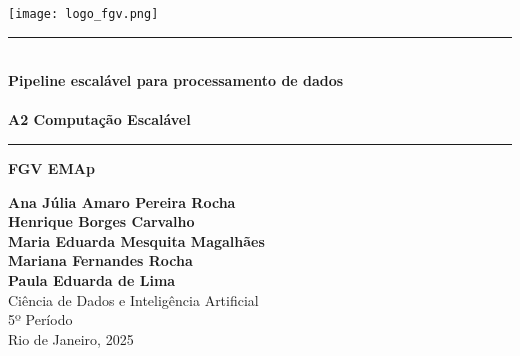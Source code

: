 \documentclass[a4paper,12pt]{article}
\begin{document}
\begin{titlepage}
    \begin{center}

        \vspace{1cm}
        \begin{minipage}{0.45\textwidth}
            \centering
            \texttt{[image: logo\_fgv.png]}    
        \end{minipage}
        \vspace{2cm}

        \rule{1\textwidth}{0.4pt} \\ %
        \vspace{0.3cm}
        {\Huge \textbf{Pipeline escalável para processamento de dados}} \\
        \vspace{0.2cm}
        \vspace{0.5cm}\\
        {\Large \textbf{A2 Computação Escalável}}\\
        \rule{1\textwidth}{0.4pt} %


        \vspace{0.5cm}
        {\Large \textbf{FGV EMAp}} \\
        \vspace{2cm}
        
        

        
        
        
        {\large 
            \textbf{Ana Júlia Amaro Pereira Rocha} \\ 
            \textbf{Henrique Borges Carvalho} \\
            \textbf{Maria Eduarda Mesquita Magalhães}\\
            \textbf{Mariana Fernandes Rocha} \\
            \textbf{Paula Eduarda de Lima}}\\[1.5cm]
        
        {\large 
            Ciência de Dados e Inteligência Artificial \\ 
            5º Período}\\[2cm]
        
        \vfill
        {\large Rio de Janeiro, 2025}

        
    \end{center}
\end{titlepage}
\end{document}
